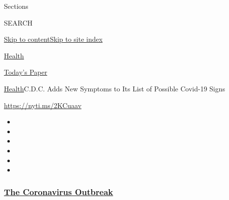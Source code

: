 Sections

SEARCH

\protect\hyperlink{site-content}{Skip to
content}\protect\hyperlink{site-index}{Skip to site index}

\href{https://www.nytimes3xbfgragh.onion/section/health}{Health}

\href{https://myaccount.nytimes3xbfgragh.onion/auth/login?response_type=cookie\&client_id=vi}{}

\href{https://www.nytimes3xbfgragh.onion/section/todayspaper}{Today's
Paper}

\href{/section/health}{Health}\textbar{}C.D.C. Adds New Symptoms to Its
List of Possible Covid-19 Signs

\url{https://nyti.ms/2KCuaav}

\begin{itemize}
\item
\item
\item
\item
\item
\item
\end{itemize}

\hypertarget{the-coronavirus-outbreak}{%
\subsubsection{\texorpdfstring{\href{https://www.nytimes3xbfgragh.onion/news-event/coronavirus?name=styln-coronavirus-national\&region=TOP_BANNER\&block=storyline_menu_recirc\&action=click\&pgtype=Article\&impression_id=ca1f3870-f284-11ea-84fb-6965c80d8485\&variant=undefined}{The
Coronavirus
Outbreak}}{The Coronavirus Outbreak}}\label{the-coronavirus-outbreak}}

